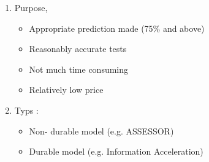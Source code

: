 \documentclass[12pt]{article}
\begin{document}
\begin{enumerate}
	\item Purpose, \begin{itemize}
		\item Appropriate prediction made (75\% and above)
		\item Reasonably accurate tests
		\item Not much time consuming
		\item Relatively low price
	\end{itemize}
	\item Typs :
	\begin{itemize}
		\item Non- durable model (e.g. ASSESSOR)
		\item Durable model (e.g. Information Acceleration)
	\end{itemize}

\end{enumerate}
\end{document}
